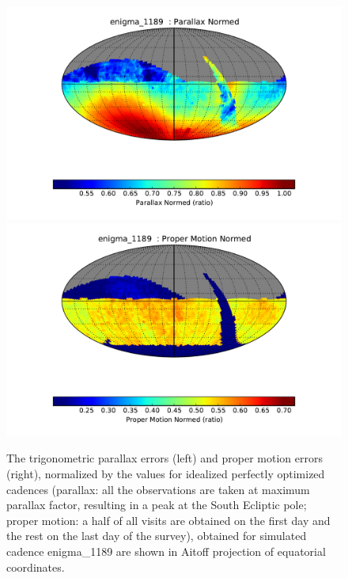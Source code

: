 \documentclass[manuscript]{article}
\begin{document}
\begin{figure}[t!]
\vskip -0.0in
\includegraphics[angle=0,width=0.49\hsize,clip]{enigma_1189_Parallax_Normed__HEAL_SkyMap.pdf}
\includegraphics[angle=0,width=0.49\hsize,clip]{enigma_1189_Proper_Motion_Normed__HEAL_SkyMap.pdf}
\vskip -0.1in
\caption{The trigonometric parallax errors (left) and proper motion errors (right), normalized
by the values for idealized perfectly optimized cadences (parallax: all the observations are taken 
at maximum parallax factor, resulting in a peak at the South Ecliptic pole; proper motion: 
a half of all visits are obtained on the first day and the rest on the last day of the survey), 
obtained for simulated cadence enigma\_1189 are shown in Aitoff projection of equatorial 
coordinates.} 
\label{fig:parapmenigma}
\end{figure}
\end{document}
